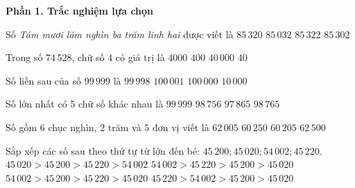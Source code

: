 \textbf{Phần 1. Trắc nghiệm lựa chọn}

\begin{ex} %
Số \textit{Tám mươi lăm nghìn ba trăm linh hai} được viết là
\choice
{$85\,320$}
{$85\,032$}
{$85\,322$}
{\True $85\,302$}
\end{ex}

\begin{ex} %
Trong số $74\,528$, chữ số $4$ có giá trị là
\choice
{\True $4000$}
{$400$}
{$40\,000$}
{$40$}
\end{ex}

\begin{ex} %
Số liền sau của số $99\,999$ là
\choice
{$99\,998$}
{$100\,001$}
{\True $100\,000$}
{$10\,000$}
\end{ex}

\begin{ex} %
Số lớn nhất có 5 chữ số khác nhau là
\choice
{$99\,999$}
{$98\,756$}
{$97\,865$}
{\True $98\,765$}
\end{ex}

\begin{ex} %
Số gồm $6$ chục nghìn, $2$ trăm và $5$ đơn vị viết là
\choice
{$62\,005$}
{$60\,250$}
{\True $60\,205$}
{$62\,500$}
\end{ex}

\begin{ex} %
Sắp xếp các số sau theo thứ tự từ lớn đến bé: $45\,200; 45\,020; 54\,002; 45\,220$.
\choice
{$45\,020 > 45\,200 > 45\,220 > 54\,002$}
{\True $54\,002 > 45\,220 > 45\,200 > 45\,020$}
{$54\,002 > 45\,200 > 45\,220 > 45\,020$}
{$45\,220 > 54\,002 > 45\,200 > 45\,020$}
\end{ex}

